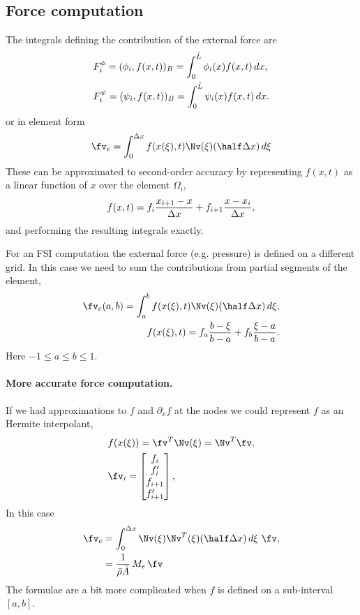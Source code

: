 \documentclass[11pt]{article}
\begin{document}
\subsection{Force computation} \label{eq:BeamModel_ForceComputation}

The integrals defining the contribution of the external force are
\begin{align}
& F_i^\phi  = ( \phi_i, f(x,t) )_B  = \int_0^{\bar{L}} \phi_i(x) f(x,t) \, dx, \\
& F_i^\psi =  ( \psi_i, f(x,t) )_B  = \int_0^{\bar{L}} \psi_i(x) f(x,t) \, dx.
\end{align}
or in element form
\begin{align}
 \fv_e = \int_0^{\dx} f(x(\xi),t) \Nv(\xi) (\half \dx) \, d\xi
\end{align} 
These can be approximated to second-order accuracy by representing $f(x,t)$ as a linear
function of $x$ over the element $\Omega_i$,
\begin{align}
   f(x,t) = f_i\frac{x_{i+1}-x}{\Delta x}  + f_{i+1} \frac{x-x_i}{\Delta x} ,
\end{align}
and performing the resulting integrals exactly. 

For an FSI computation the external force (e.g. pressure) is defined on a different grid. In this case we need
to sum the contributions from partial segments of the element,
\begin{align}
 \fv_e(a,b) = \int_a^{b} f(x(\xi),t) \Nv(\xi) (\half \dx) \, d\xi, \\
   f(x(\xi),t) = f_a\frac{b-\xi}{b-a}  + f_b \frac{\xi-a}{b-a} .
\end{align} 
Here $-1\le a \le b \le 1$. 

\paragraph{More accurate force computation.} If we had approximations to $f$ and $\partial_x f$ at the nodes we
could represent $f$ as an Hermite interpolant,
\begin{align}
&  f(x(\xi)) =  \fv^T \Nv(\xi) = \Nv^T\fv , \\
&  \fv_i = \begin{bmatrix} 
 f_i \\  f'_i \\ f_{i+1} \\ f'_{i+1}
              \end{bmatrix},
\end{align} 
In this case 
\begin{align}
 \fv_e &= \int_0^{\dx} \Nv(\xi) \Nv^T(\xi)  (\half \dx) \, d\xi ~\fv, \\
       &= \frac{1}{\rhos\As} \, M_e \, \fv
\end{align} 
The formulae are a bit more complicated when $f$ is defined on a sub-interval $[a,b]$. 
\end{document}
